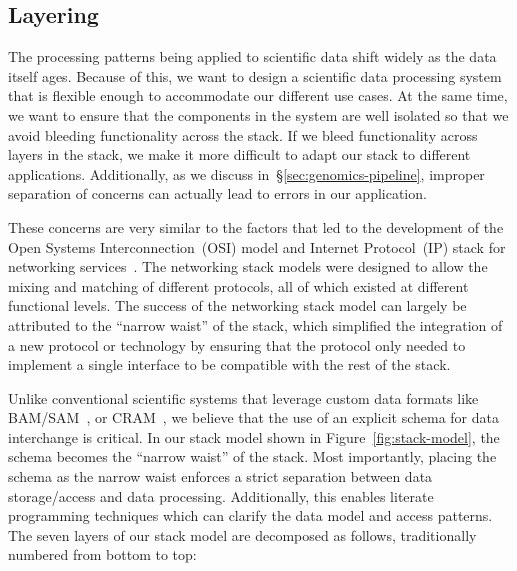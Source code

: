\documentclass{acm_proc_article-sp}
\begin{document}
\subsection{Layering}
\label{sec:layering}

The processing patterns being applied to scientific data shift widely
as the data itself ages. Because of this, we want to design a scientific data processing system that is
flexible enough to accommodate our different use cases. At the same time, we want to ensure that the
components in the system are well isolated so that we avoid bleeding functionality across the stack. If
we bleed functionality across layers in the stack, we make it more difficult to adapt our stack to different
applications. Additionally, as we discuss in~\S\ref{sec:genomics-pipeline}, improper separation of
concerns can actually lead to errors in our application.

These concerns are very similar to the factors that led to the development of the Open Systems
Interconnection~(OSI) model and Internet Protocol~(IP) stack for networking
services~\cite{zimmermann80}. The networking stack models were designed to allow the mixing and
matching of different protocols, all of which existed at different functional levels. The success of the
networking stack model can largely be attributed to the ``narrow waist'' of the stack, which simplified the
integration of a new protocol or technology by ensuring that the protocol only needed to implement a
single interface to be compatible with the rest of the stack.

Unlike conventional scientific systems that leverage custom data formats like BAM/SAM~\cite{li09},
or CRAM~\cite{fritz11}, we believe that the use of an explicit schema for data interchange is critical.
In our stack model shown in Figure~\ref{fig:stack-model}, the schema becomes the ``narrow waist''
of the stack. Most importantly, placing the schema as the narrow waist enforces a strict separation
between data storage/access and data processing. Additionally, this enables literate programming
techniques which can clarify the data model and access patterns. The seven layers of our stack model
are decomposed as follows, traditionally numbered from bottom to top:
\end{document}
